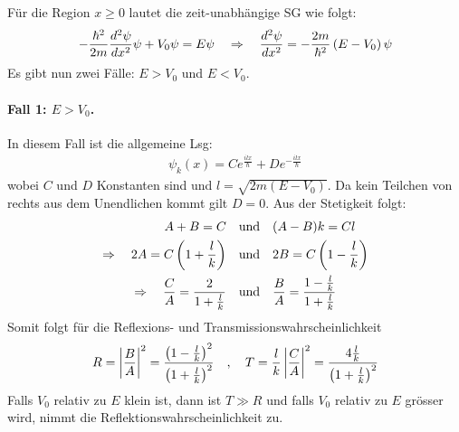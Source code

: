 Für die Region $x \geq 0$ lautet die zeit-unabhängige SG wie folgt:
\begin{align*}
    - \frac{\hbar^2}{2m} \frac{d^2 \psi}{dx^2} \psi + V_0 \psi = E \psi
    \hspace{10pt} \Rightarrow \hspace{10pt}
    \frac{d^2 \psi}{d x^2} = - \frac{2m}{\hbar^2} \left( E-V_0 \right) \psi
\end{align*}
Es gibt nun zwei Fälle: $E>V_0$ und $E<V_0$.

\paragraph{Fall 1: $E>V_0$.} In diesem Fall ist die allgemeine Lsg:
\begin{align*}
    \psi_k (x) = C e^{\frac{i l x}{\hbar}} + D e^{-\frac{i l x}{\hbar}}
\end{align*}
wobei $C$ und $D$ Konstanten sind und $l = \sqrt{2m(E-V_0)}$.
Da kein Teilchen von rechts aus dem Unendlichen kommt gilt $D=0$.
Aus der Stetigkeit folgt:
\begin{align*}
    A + B = C
    \hspace{10pt} &\text{und} \hspace{10pt}
    (A-B)k = C l
    \\
    \Rightarrow \hspace{10pt}
    2A = C \left( 1+\frac{l}{k} \right)
    \hspace{10pt} &\text{und} \hspace{10pt}
    2B = C \left( 1-\frac{l}{k} \right)
    \\
    \Rightarrow \hspace{10pt}
    \frac{C}{A} = \frac{2}{1+\frac{l}{k}}
    \hspace{10pt} &\text{und} \hspace{10pt}
    \frac{B}{A} = \frac{1-\frac{l}{k}}{1+\frac{l}{k}}
\end{align*}
Somit folgt für die Reflexions- und Transmissionswahrscheinlichkeit
\begin{align*}
    R = \left\vert \frac{B}{A} \right\vert^2 = \frac{\left( 1-\frac{l}{k} \right)^2}{\left( 1+\frac{l}{k} \right)^2}
    \hspace{10pt} , \hspace{10pt}
    T = \frac{l}{k} \left\vert \frac{C}{A} \right\vert^2 = \frac{4 \frac{l}{k}}{\left( 1+\frac{l}{k} \right)^2}
\end{align*}
Falls $V_0$ relativ zu $E$ klein ist, dann ist $T \gg R$ und falls $V_0$
relativ zu $E$ grösser wird, nimmt die Reflektionswahrscheinlichkeit zu.

